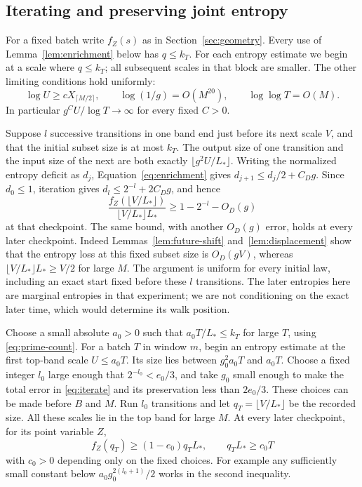 \subsection{Iterating and preserving joint entropy}

For a fixed batch write \(f_Z(s)\) as in Section~\ref{sec:geometry}.
Every use of Lemma~\ref{lem:enrichment} below has \(q\le k_T\).
For each entropy estimate we begin at a scale where
\(q\le k_T\); all subsequent scales in that block are smaller.
The other limiting conditions hold uniformly:
\[
\log U\ge cX_{\lceil M/2\rceil},\qquad
\log(1/g)=O(M^{20}),\qquad
\log\log T=O(M).
\]
In particular \(g^CU/\log T\to\infty\) for every fixed \(C>0\).

Suppose \(l\) successive transitions in one band end just before its
next scale \(V\), and that the initial subset size is at most \(k_T\).
The output size of one transition and the input size of the next are
both exactly \(\lfloor g^2U/L_*\rfloor\).
Writing the normalized entropy deficit as \(d_j\),
Equation~\eqref{eq:enrichment} gives
\(d_{j+1}\le d_j/2+C_Dg\). Since \(d_0\le1\), iteration gives
\(d_l\le2^{-l}+2C_Dg\), and hence
\begin{equation}\label{eq:iterate}
\frac{f_Z(\lfloor V/L_*\rfloor)}
     {\lfloor V/L_*\rfloor L_*}
\ge1-2^{-l}-O_D(g)
\end{equation}
at that checkpoint.
The same bound, with another \(O_D(g)\) error, holds at every later
checkpoint. Indeed Lemmas~\ref{lem:future-shift}
and~\ref{lem:displacement} show that the entropy loss at this fixed
subset size is \(O_D(gV)\), whereas
\(\lfloor V/L_*\rfloor L_*\ge V/2\) for large \(M\).
The argument is uniform for every initial law, including an exact
start fixed before these \(l\) transitions. The later entropies here
are marginal entropies in that experiment; we are not conditioning on
the exact later time, which would determine its walk position.

Choose a small absolute \(a_0>0\) such that
\(a_0T/L_*\le k_T\) for large \(T\), using \eqref{eq:prime-count}.
For a batch \(T\) in window \(m\), begin an entropy estimate at the
first top-band scale \(U\le a_0T\).
Its size lies between \(g_0^2a_0T\) and \(a_0T\).
Choose a fixed integer \(l_0\) large enough that
\(2^{-l_0}<e_0/3\), and take \(g_0\) small enough to make the total
error in \eqref{eq:iterate} and its preservation less than \(2e_0/3\).
These choices can be made before \(B\) and \(M\).
Run \(l_0\) transitions and let \(q_T=\lfloor V/L_*\rfloor\) be the
recorded size. All these scales lie in the top band for large \(M\).
At every later checkpoint, for its point variable \(Z\),
\begin{equation}\label{eq:global-entropy}
f_Z(q_T)\ge(1-e_0)q_TL_*,
\qquad q_TL_*\ge c_0T
\end{equation}
with \(c_0>0\) depending only on the fixed choices.
For example any sufficiently small constant below
\(a_0g_0^{2(l_0+1)}/2\) works in the second inequality.

